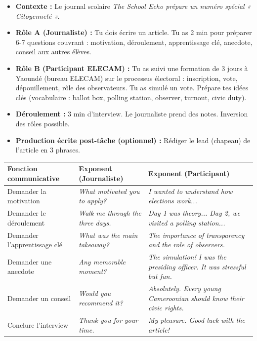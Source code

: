 \documentclass[11pt]{article}
\newcommand{\cle}[1]{{\popxbold\color{popdark}#1}}
\newcommand{\eng}[1]{\ifmmode\text{\textit{#1}}\else\begingroup\selectlanguage{english}\itshape #1\endgroup\fi}
\begin{document}
\begin{experience}
\begin{itemize}
    \item \textbf{Contexte :} Le journal scolaire \eng{The School Echo} prépare un numéro spécial « Citoyenneté ».
    \item \textbf{Rôle A (Journaliste) :} Tu dois écrire un article. Tu as 2 min pour préparer 6-7 questions couvrant : motivation, déroulement, apprentissage clé, anecdote, conseil aux autres élèves.
    \item \textbf{Rôle B (Participant ELECAM) :} Tu as suivi une formation de 3 jours à Yaoundé (bureau ELECAM) sur le processus électoral : inscription, vote, dépouillement, rôle des observateurs. Tu as simulé un vote. Prépare tes idées clés (vocabulaire : \cle{ballot box}, \cle{polling station}, \cle{observer}, \cle{turnout}, \cle{civic duty}).
    \item \textbf{Déroulement :} 3 min d'interview. Le journaliste prend des notes. Inversion des rôles possible.
    \item \textbf{Production écrite post-tâche (optionnel) :} Rédiger le lead (chapeau) de l'article en 3 phrases.
\end{itemize}
\end{experience}

\begin{center}
\begin{tabularx}{\linewidth}{|X|X|X|}
\hline
\rowcolor{popblueL} \textbf{Fonction communicative} & \textbf{Exponent (Journaliste)} & \textbf{Exponent (Participant)} \\
\hline
Demander la motivation & \eng{What motivated you to apply?} & \eng{I wanted to understand how elections work...} \\
\hline
Demander le déroulement & \eng{Walk me through the three days.} & \eng{Day 1 was theory... Day 2, we visited a polling station...} \\
\hline
Demander l'apprentissage clé & \eng{What was the main takeaway?} & \eng{The importance of transparency and the role of observers.} \\
\hline
Demander une anecdote & \eng{Any memorable moment?} & \eng{The simulation! I was the presiding officer. It was stressful but fun.} \\
\hline
Demander un conseil & \eng{Would you recommend it?} & \eng{Absolutely. Every young Cameroonian should know their civic rights.} \\
\hline
Conclure l'interview & \eng{Thank you for your time.} & \eng{My pleasure. Good luck with the article!} \\
\hline
\end{tabularx}
\end{center}
\end{document}
